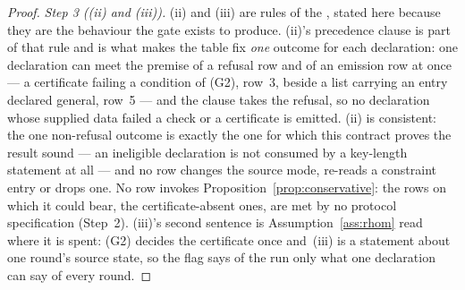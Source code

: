 \begin{proof}
\emph{Step 3 ((ii) and (iii)).} (ii) and (iii) are rules of the
, stated here because they are the behaviour the gate exists to produce.
(ii)'s precedence clause is part of that rule and is what makes the table fix
\emph{one} outcome for each declaration: one declaration can meet the premise
of a refusal row and of an emission row at once --- a certificate failing a
condition of (G2), row~3, beside a list carrying an entry declared general,
row~5 --- and the clause takes the refusal, so no declaration whose supplied
data failed a check or a certificate is emitted.
(ii) is consistent: the one non-refusal outcome is exactly the one for which
this contract proves the result sound --- an ineligible declaration is not
consumed by a key-length statement at all --- and no row changes the source
mode, re-reads a constraint entry or drops one. No row invokes
Proposition~\ref{prop:conservative}: the rows on which it could bear, the
certificate-absent ones, are met by no protocol specification (Step~2).
(iii)'s second sentence is
Assumption~\ref{ass:rhom} read where it is spent: (G2) decides the certificate
once and \,(iii) is a statement
about one round's source state, so the flag says of the run only what one
declaration can say of every round.


\end{proof}
